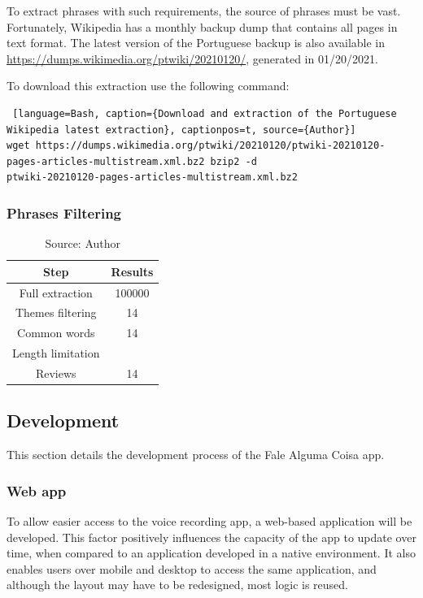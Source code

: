 To extract phrases with such requirements, the source of phrases must be vast. Fortunately, Wikipedia has a monthly backup dump that contains all pages in text format. The latest version of the Portuguese backup is also available in \url{https://dumps.wikimedia.org/ptwiki/20210120/}, generated in 01/20/2021.

To download this extraction use the following command:

\begin{lstlisting} [language=Bash, caption={Download and extraction of the Portuguese Wikipedia latest extraction}, captionpos=t, source={Author}]
wget https://dumps.wikimedia.org/ptwiki/20210120/ptwiki-20210120-pages-articles-multistream.xml.bz2 bzip2 -d
ptwiki-20210120-pages-articles-multistream.xml.bz2
\end{lstlisting}

\subsubsection{Phrases Filtering}

\begin{table}[h]
    \centering
    \caption{SLR - Filtering of results}
    \begin{tabular}{|c|c|}
        \hline Step & Results \\ \hline
        Full extraction & 100000 \\ \hline
        Themes filtering & 14 \\ \hline
        Common words & 14 \\ \hline
        Length limitation &  \\ \hline
        Reviews & 14 \\ \hline
    \end{tabular}
    \caption*{Source: Author}
    \label{tab:filtering}
\end{table}

\subsection{Development}
\label{sec:app-development}

This section details the development process of the Fale Alguma Coisa app.

\subsubsection{Web app}

To allow easier access to the voice recording app, a web-based application will be developed. This factor positively influences the capacity of the app to update over time, when compared to an application developed in a native environment. It also enables users over mobile and desktop to access the same application, and although the layout may have to be redesigned, most logic is reused.

